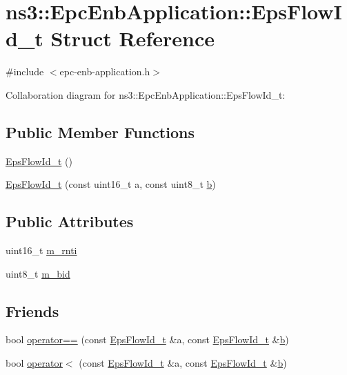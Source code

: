 \hypertarget{structns3_1_1EpcEnbApplication_1_1EpsFlowId__t}{}\section{ns3\+:\+:Epc\+Enb\+Application\+:\+:Eps\+Flow\+Id\+\_\+t Struct Reference}
\label{structns3_1_1EpcEnbApplication_1_1EpsFlowId__t}


{\ttfamily \#include $<$epc-\/enb-\/application.\+h$>$}



Collaboration diagram for ns3\+:\+:Epc\+Enb\+Application\+:\+:Eps\+Flow\+Id\+\_\+t\+:
\subsection*{Public Member Functions}
\begin{DoxyCompactItemize}
\item 
\hyperlink{structns3_1_1EpcEnbApplication_1_1EpsFlowId__t_a03896c0e161b2f855b5840da289ab31d}{Eps\+Flow\+Id\+\_\+t} ()
\item 
\hyperlink{structns3_1_1EpcEnbApplication_1_1EpsFlowId__t_a4c3028e4a4d57c6cd8956eb90c96f8d0}{Eps\+Flow\+Id\+\_\+t} (const uint16\+\_\+t a, const uint8\+\_\+t \hyperlink{lte__pathloss_8m_a21ad0bd836b90d08f4cf640b4c298e7c}{b})
\end{DoxyCompactItemize}
\subsection*{Public Attributes}
\begin{DoxyCompactItemize}
\item 
uint16\+\_\+t \hyperlink{structns3_1_1EpcEnbApplication_1_1EpsFlowId__t_a167d2ecbb76616a5584e2e06d47557ef}{m\+\_\+rnti}
\item 
uint8\+\_\+t \hyperlink{structns3_1_1EpcEnbApplication_1_1EpsFlowId__t_a2d950e68f03c8baff939ed8817d46190}{m\+\_\+bid}
\end{DoxyCompactItemize}
\subsection*{Friends}
\begin{DoxyCompactItemize}
\item 
bool \hyperlink{structns3_1_1EpcEnbApplication_1_1EpsFlowId__t_a24d9594d72cee0b25bfa74efdfcf2e96}{operator==} (const \hyperlink{structns3_1_1EpcEnbApplication_1_1EpsFlowId__t}{Eps\+Flow\+Id\+\_\+t} \&a, const \hyperlink{structns3_1_1EpcEnbApplication_1_1EpsFlowId__t}{Eps\+Flow\+Id\+\_\+t} \&\hyperlink{lte__pathloss_8m_a21ad0bd836b90d08f4cf640b4c298e7c}{b})
\item 
bool \hyperlink{structns3_1_1EpcEnbApplication_1_1EpsFlowId__t_afbdf0d28c4d74b9985daeb1e5e660bec}{operator$<$} (const \hyperlink{structns3_1_1EpcEnbApplication_1_1EpsFlowId__t}{Eps\+Flow\+Id\+\_\+t} \&a, const \hyperlink{structns3_1_1EpcEnbApplication_1_1EpsFlowId__t}{Eps\+Flow\+Id\+\_\+t} \&\hyperlink{lte__pathloss_8m_a21ad0bd836b90d08f4cf640b4c298e7c}{b})
\end{DoxyCompactItemize}


